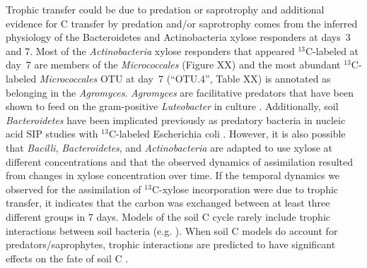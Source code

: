 Trophic transfer could be due to predation or saprotrophy and additional
evidence for C transfer by predation and/or saprotrophy comes from the
inferred physiology of the Bacteroidetes and Actinobacteria xylose responders
at days~3 and 7. Most of the \textit{Actinobacteria} xylose responders that
appeared $^{13}$C-labeled at day~7 are members of the \textit{Micrococcales} (Figure
XX) and the most abundant $^{13}$C-labeled \textit{Micrococcales} OTU at day~7
(“OTU.4”, Table XX) is annotated as belonging in the \textit{Agromyces}.
\textit{Agromyces} are facilitative predators that have been shown to feed on
the gram-positive \textit{Luteobacter} in culture \citep{16346402}.
Additionally, soil \textit{Bacteroidetes} have been implicated previously as
predatory bacteria in nucleic acid SIP studies with $^{13}$C-labeled
Escherichia coli \citep{Lueders2006}. However, it is also possible that 
\textit{Bacilli}, \textit{Bacteroidetes}, and \textit{Actinobacteria} are
adapted to use xylose at different concentrations and that the observed
dynamics of assimilation resulted from changes in xylose concentration over
time. If the temporal dynamics we observed for the assimilation of
$^{13}$C-xylose incorporation were due to trophic transfer, it indicates that
the carbon was exchanged between at least three different groups in 7 days.
Models of the soil C cycle rarely include trophic interactions between soil
bacteria (e.g. \citep{Moore1988}). When soil C models do account for
predators/saprophytes, trophic interactions are predicted to have significant
effects on the fate of soil C \citep{Kaiser2014a}. 

